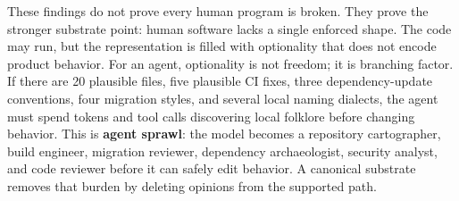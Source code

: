 These findings do not prove every human program is broken. They prove the stronger substrate point: human software lacks a single enforced shape. The code may run, but the representation is filled with optionality that does not encode product behavior. For an agent, optionality is not freedom; it is branching factor. If there are 20 plausible files, five plausible CI fixes, three dependency-update conventions, four migration styles, and several local naming dialects, the agent must spend tokens and tool calls discovering local folklore before changing behavior. This is \textbf{agent sprawl}: the model becomes a repository cartographer, build engineer, migration reviewer, dependency archaeologist, security analyst, and code reviewer before it can safely edit behavior. A canonical substrate removes that burden by deleting opinions from the supported path.

